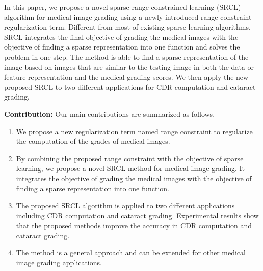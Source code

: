 \documentclass[journal]{IEEEtran}
\begin{document}
     In this paper,
     we propose  a novel sparse range-constrained learning (SRCL)
     algorithm for medical image grading using a newly introduced range constraint regularization term. Different from most of existing
     sparse learning algorithms, SRCL integrates the final objective of grading the medical images  with the objective of finding a sparse representation into one function and solves the problem in one step. The method is able to find a sparse
     representation of the image based on images that are similar to the testing image in
     both the data or feature representation and the medical grading scores. 
      We then apply
     the new proposed SRCL to two different applications for CDR computation and cataract grading.
     
    \textbf{Contribution:} Our main contributions are summarized as
    follows.  
  
     \begin{enumerate}
     	 \item We propose a new regularization term named range constraint to regularize the computation of the grades of medical images.
     	\item By combining the proposed range constraint with the objective of sparse learning, we propose a novel    SRCL method for medical image grading. It integrates the   objective of grading the medical images with the objective of finding a sparse representation into one function. 
     	 \item The proposed SRCL algorithm is applied to two different applications including CDR computation   and cataract grading. 
     	  Experimental results show that the proposed methods improve the accuracy in  CDR computation and cataract grading.
     	\item The method is a general approach and can be extended for other medical image grading applications.
     	
     	
     \end{enumerate}
     
\end{document}
